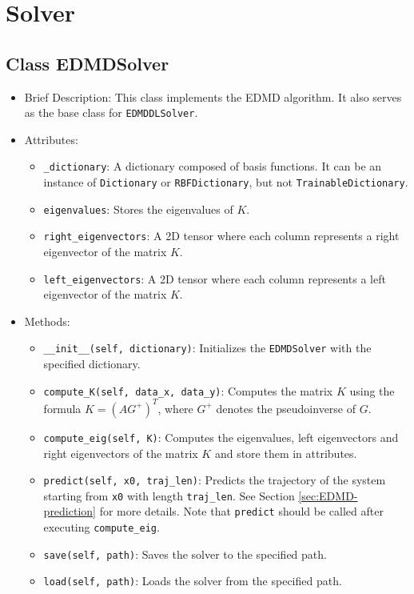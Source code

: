 \section{Solver}

\subsection{Class EDMDSolver}

\begin{itemize}
\item Brief Description: This class implements the EDMD algorithm.
  It also serves as the base class for \lstinline|EDMDDLSolver|.
\item Attributes:
  \begin{itemize}
  \item \lstinline|_dictionary|:
    A dictionary composed of basis functions.
    It can be an instance of \lstinline|Dictionary|
    or \lstinline|RBFDictionary|,
    but not \lstinline|TrainableDictionary|.
  \item \lstinline|eigenvalues|: Stores the eigenvalues of $K$.
  \item \lstinline|right_eigenvectors|: A 2D tensor where each column represents a right eigenvector of the matrix $K$.
  \item \lstinline|left_eigenvectors|: A 2D tensor where each column represents a left eigenvector of the matrix $K$.
  \end{itemize}
\item Methods:
  \begin{itemize}
  \item \lstinline|__init__(self, dictionary)|:
    Initializes the \lstinline|EDMDSolver| with the specified dictionary.
  \item \lstinline|compute_K(self, data_x, data_y)|:
    Computes the matrix $K$ using the formula $K = (AG^+)^T$,
    where $G^+$ denotes the pseudoinverse of $G$.
  \item \lstinline|compute_eig(self, K)|: Computes the eigenvalues,
    left eigenvectors and right eigenvectors of the matrix $K$ and
    store them in attributes.
  \item \lstinline|predict(self, x0, traj_len)|:
    Predicts the trajectory of the system starting from \lstinline|x0|
    with length \lstinline|traj_len|. 
    See Section \ref{sec:EDMD-prediction} for more details.
    Note that \lstinline|predict| should be called after executing
    \lstinline|compute_eig|.
  \item \lstinline|save(self, path)|: Saves the solver to the specified path.
  \item \lstinline|load(self, path)|: Loads the solver from the specified path.
  \end{itemize}
\end{itemize}

